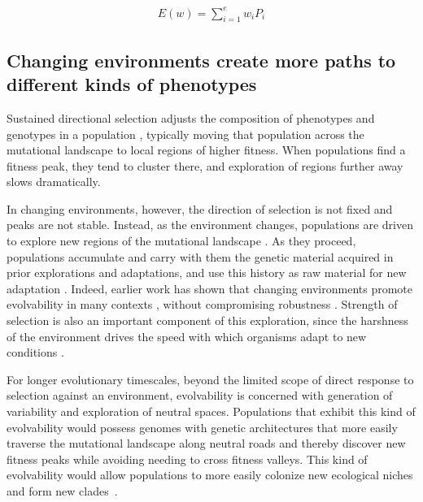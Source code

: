 \documentclass[10pt,letterpaper,final]{article}
\begin{document}
	\begin{eqnarray}
	\label{eq:expected_fitness_value}
		E(w) = \displaystyle\sum_{i=1}^{e} w_i P_i
	\end{eqnarray}

\subsection*{Changing environments create more paths to different kinds of phenotypes}
Sustained directional selection adjusts the composition of phenotypes and genotypes in a population \cite{wright_evolution_1931}, typically moving that population across the mutational landscape to local regions of higher fitness. When populations find a fitness peak, they tend to cluster there, and exploration of regions further away slows dramatically.

In changing environments, however, the direction of selection is not fixed and peaks are not stable.  Instead, as the environment changes, populations are driven to explore new regions of the mutational landscape \cite{kashtan_varying_2007,parter_facilitated_2008,connelly_negative_2015}. As they proceed, populations accumulate and carry with them the genetic material acquired in prior explorations and adaptations, and use this history as raw material for new adaptation \cite{mcclintock_significance_1993}. Indeed, earlier work has shown that changing environments promote evolvability in many contexts \cite{kashtan_varying_2007}, without compromising robustness \cite{crombach_evolution_2008,wilke_evolution_2001}. Strength of selection is also an important component of this exploration, since the harshness of the environment drives the speed with which organisms adapt to new conditions \cite{goddard_sex_2005}.


For longer evolutionary timescales, beyond the limited scope of direct response to selection against an environment, evolvability is concerned with generation of variability and exploration of neutral spaces. Populations that exhibit this kind of evolvability would possess genomes with genetic architectures that more easily traverse the mutational landscape along neutral roads and thereby discover new fitness peaks while avoiding needing to cross fitness valleys. This kind of evolvability would allow populations to more easily colonize new ecological niches and form new clades~\cite{kirschner_evolvability_1998,brookfield_evolution:_2001}.
\end{document}
